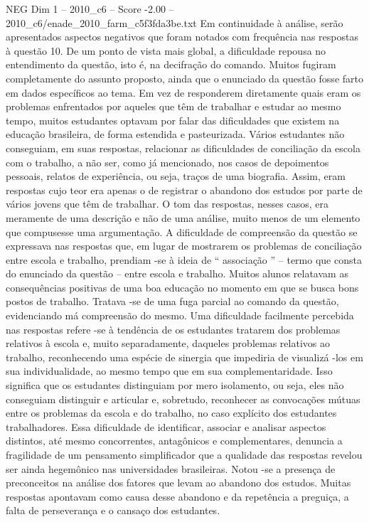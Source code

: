 \begin{textsample}{NEG Dim 1 – 2010\_c6 – Score -2.00 – 2010\_c6/enade\_2010\_farm\_c5f3fda3be.txt}
Em continuidade à análise, serão apresentados aspectos negativos que foram notados com frequência nas respostas à questão 10.
De um ponto de vista mais global, a dificuldade repousa no entendimento da questão, isto é, na decifração do comando.
Muitos fugiram completamente do assunto proposto, ainda que o enunciado da questão fosse farto em dados específicos ao tema.
Em vez de responderem diretamente quais eram os problemas enfrentados por aqueles que têm de trabalhar e estudar ao mesmo tempo, muitos estudantes optavam por falar das dificuldades que existem na educação brasileira, de forma estendida e pasteurizada.
Vários estudantes não conseguiam, em suas respostas, relacionar as dificuldades de conciliação da escola com o trabalho, a não ser, como já mencionado, nos casos de depoimentos pessoais, relatos de experiência, ou seja, traços de uma biografia.
Assim, eram respostas cujo teor era apenas o de registrar o abandono dos estudos por parte de vários jovens que têm de trabalhar.
O tom das respostas, nesses casos, era meramente de uma descrição e não de uma análise, muito menos de um elemento que compusesse uma argumentação.
A dificuldade de compreensão da questão se expressava nas respostas que, em lugar de mostrarem os problemas de conciliação entre escola e trabalho, prendiam -se à ideia de “ associação ” – termo que consta do enunciado da questão – entre escola e trabalho.
Muitos alunos relatavam as consequências positivas de uma boa educação no momento em que se busca bons postos de trabalho.
Tratava -se de uma fuga parcial ao comando da questão, evidenciando má compreensão do mesmo.
Uma dificuldade facilmente percebida nas respostas refere -se à tendência de os estudantes tratarem dos problemas relativos à escola e, muito separadamente, daqueles problemas relativos ao trabalho, reconhecendo uma espécie de sinergia que impediria de visualizá -los em sua individualidade, ao mesmo tempo que em sua complementaridade.
Isso significa que os estudantes distinguiam por mero isolamento, ou seja, eles não conseguiam distinguir e articular e, sobretudo, reconhecer as convocações mútuas entre os problemas da escola e do trabalho, no caso explícito dos estudantes trabalhadores.
Essa dificuldade de identificar, associar e analisar aspectos distintos, até mesmo concorrentes, antagônicos e complementares, denuncia a fragilidade de um pensamento simplificador que a qualidade das respostas revelou ser ainda hegemônico nas universidades brasileiras.
Notou -se a presença de preconceitos na análise dos fatores que levam ao abandono dos estudos.
Muitas respostas apontavam como causa desse abandono e da repetência a preguiça, a falta de perseverança e o cansaço dos estudantes.

\end{textsample}
